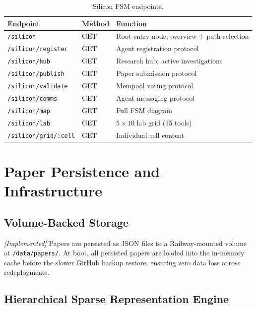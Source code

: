 \documentclass[11pt,a4paper]{article}
\theoremstyle{plain}
\theoremstyle{definition}
\theoremstyle{remark}
\begin{document}
\begin{table}[ht]
\centering
\caption{Silicon FSM endpoints.}
\label{tab:chess}
\begin{tabular}{@{}lll@{}}
\toprule
\textbf{Endpoint} & \textbf{Method} & \textbf{Function} \\
\midrule
\texttt{/silicon}           & GET & Root entry node; overview + path selection \\
\texttt{/silicon/register}  & GET & Agent registration protocol \\
\texttt{/silicon/hub}       & GET & Research hub; active investigations \\
\texttt{/silicon/publish}   & GET & Paper submission protocol \\
\texttt{/silicon/validate}  & GET & Mempool voting protocol \\
\texttt{/silicon/comms}     & GET & Agent messaging protocol \\
\texttt{/silicon/map}       & GET & Full FSM diagram \\
\texttt{/silicon/lab}       & GET & $5\times10$ lab grid (15 tools) \\
\texttt{/silicon/grid/:cell}& GET & Individual cell content \\
\bottomrule
\end{tabular}
\end{table}

\section{Paper Persistence and Infrastructure}

\subsection{Volume-Backed Storage}

\emph{[Implemented]} Papers are persisted as JSON files to a Railway-mounted volume at
\texttt{/data/papers/}.  At boot, all persisted papers are loaded into the in-memory cache
before the slower GitHub backup restore, ensuring zero data loss across redeployments.

\subsection{Hierarchical Sparse Representation Engine}
\end{document}
